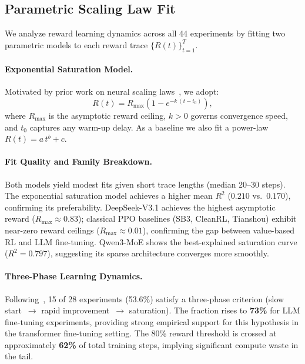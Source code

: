 \documentclass{article}
\begin{document}
\subsection{Parametric Scaling Law Fit}
\label{sec:scaling_laws}

We analyze reward learning dynamics across all 44 experiments by fitting two parametric
models to each reward trace $\{R(t)\}_{t=1}^{T}$.

\paragraph{Exponential Saturation Model.}
Motivated by prior work on neural scaling laws~\cite{nimmaturi2025predictive}, we adopt:
\begin{equation}
  \label{eq:exp_sat}
  R(t) = R_{\max}\!\left(1 - e^{-k\,(t - t_0)}\right),
\end{equation}
where $R_{\max}$ is the asymptotic reward ceiling, $k > 0$ governs convergence speed,
and $t_0$ captures any warm-up delay.
As a baseline we also fit a power-law $R(t) = a\,t^{b} + c$.

\paragraph{Fit Quality and Family Breakdown.}
Both models yield modest fits given short trace lengths (median 20--30 steps).
The exponential saturation model achieves a higher mean $R^{2}$ ($0.210$ vs.\ $0.170$),
confirming its preferability. DeepSeek-V3.1 achieves the highest asymptotic reward
($R_{\max} \approx 0.83$); classical PPO baselines (SB3, CleanRL, Tianshou) exhibit
near-zero reward ceilings ($R_{\max} \approx 0.01$), confirming the gap between
value-based RL and LLM fine-tuning. Qwen3-MoE shows the best-explained saturation
curve ($R^{2} = 0.797$), suggesting its sparse architecture converges more smoothly.

\paragraph{Three-Phase Learning Dynamics.}
Following~\citet{nimmaturi2025predictive}, 15 of 28 experiments (53.6\%) satisfy
a three-phase criterion (slow start~$\to$ rapid improvement~$\to$ saturation).
The fraction rises to \textbf{73\%} for LLM fine-tuning experiments, providing
strong empirical support for this hypothesis in the transformer fine-tuning setting.
The 80\% reward threshold is crossed at approximately \textbf{62\%} of total
training steps, implying significant compute waste in the tail.
\end{document}
